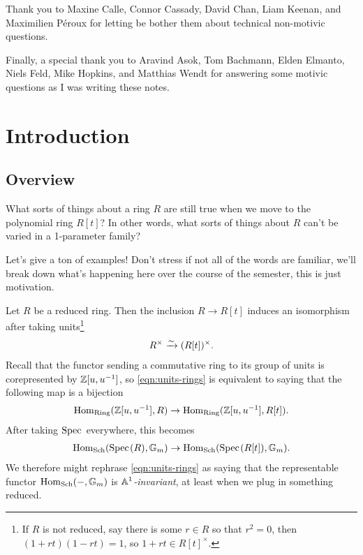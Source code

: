 \documentclass[11pt,openany]{book}
\begin{document}
Thank you to Maxine Calle, Connor Cassady, David Chan, Liam Keenan, and Maximilien P\'eroux for letting be bother them about technical non-motivic questions.

Finally, a special thank you to Aravind Asok, Tom Bachmann, Elden Elmanto, Niels Feld, Mike Hopkins, and Matthias Wendt for answering some motivic questions as I was writing these notes.

\section{Introduction}

\subsection{Overview} What sorts of things about a ring $R$ are still true when we move to the polynomial ring $R[t]$? In other words, what sorts of things about $R$ can't be varied in a 1-parameter family?

Let's give a ton of examples! Don't stress if not all of the words are familiar, we'll break down what's happening here over the course of the semester, this is just motivation.

\begin{example} Let $R$ be a reduced ring. Then the inclusion $R \to R[t]$ induces an isomorphism after taking units\footnote{If $R$ is not reduced, say there is some $r\in R$ so that $r^2 = 0$, then $(1+rt)(1-rt) = 1$, so $1+rt\in R[t]^\times$.}
\begin{equation}\label{eqn:units-rings}
\begin{aligned}
    R^\times \xrightarrow{\sim} (R[t])^\times.
\end{aligned}
\end{equation}
Recall that the functor sending a commutative ring to its group of units is corepresented by $\mathbb{Z}[u,u^{-1}]$, so \autoref{eqn:units-rings} is equivalent to saying that the following map is a bijection
\begin{align*}
    \mathrm{Hom}_{\mathrm{Ring}}(\mathbb{Z}[u,u^{-1}],R) \to \mathrm{Hom}_{\mathrm{Ring}}(\mathbb{Z}[u,u^{-1}],R[t]).
\end{align*}
After taking $\text{Spec}\hspace{0.1em}$ everywhere, this becomes
\begin{align*}
    \mathrm{Hom}_{\mathrm{Sch}}(\text{Spec}\hspace{0.1em}(R),\mathbb{G}_m) \to \mathrm{Hom}_{\mathrm{Sch}}(\text{Spec}\hspace{0.1em}(R[t]),\mathbb{G}_m).
\end{align*}
We therefore might rephrase \autoref{eqn:units-rings} as saying that the representable functor $\mathrm{Hom}_{\mathrm{Sch}}(-,\mathbb{G}_m)$ is \textit{$\mathbb{A}^1$-invariant}, at least when we plug in something reduced.
\end{example}
\end{document}
